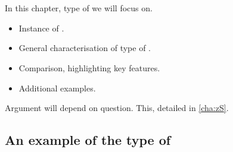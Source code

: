 \chapter{ }
\label{sec:clar:type-of-scen}

\begin{note}
  In this chapter, type of  we will focus on.
  \begin{itemize}
  \item
    Instance of .
  \item
    General characterisation of type of .
  \item
    Comparison, highlighting key features.
  \item
    Additional examples.
  \end{itemize}

  Argument will depend on question.
  This, detailed in \autoref{cha:zS}.
\end{note}

\section{An example of the type of }

